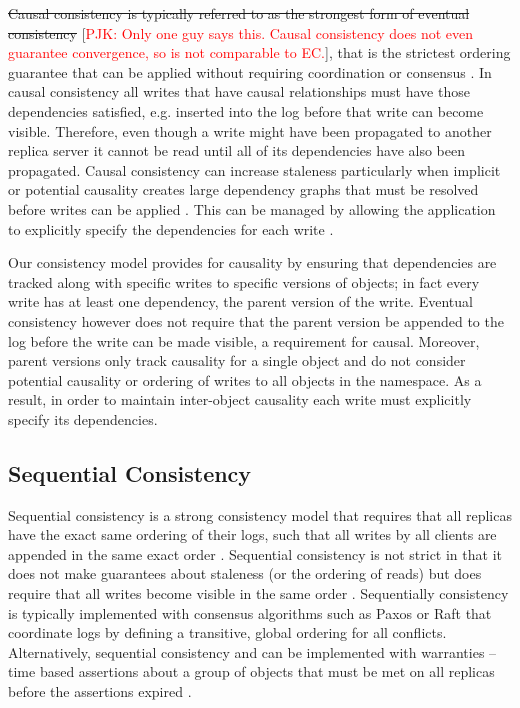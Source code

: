 \documentclass[10pt,conference,compsocconf,letterpaper]{IEEEtran}
\newcommand{\todo}[1]{{\textcolor{red}{#1}}}
\newcommand{\pjk}[1]{[\todo{PJK: #1}]}
\begin{document}
\st{Causal consistency is typically referred to as the strongest form of eventual consistency} \pjk{Only one guy says this. Causal consistency does not even guarantee convergence, so is not comparable to EC.}, that is the strictest ordering guarantee that can be applied without requiring coordination or consensus \cite{ladin_providing_1992}. In causal consistency all writes that have causal relationships must have those dependencies satisfied, e.g. inserted into the log before that write can become visible. Therefore, even though a write might have been propagated to another replica server it cannot be read until all of its dependencies have also been propagated. Causal consistency can increase staleness particularly when implicit or potential causality creates large dependency graphs that must be resolved before writes can be applied \cite{lloyd_dont_2011}. This can be managed by allowing the application to explicitly specify the dependencies for each write \cite{bailis_potential_2012}.

Our consistency model provides for causality by ensuring that dependencies are tracked along with specific writes to specific versions of objects; in fact every write has at least one dependency, the parent version of the write. Eventual consistency however does not require that the parent version be appended to the log before the write can be made visible, a requirement for causal. Moreover, parent versions only track causality for a single object and do not consider potential causality or ordering of writes to all objects in the namespace. As a result, in order to maintain inter-object causality each write must explicitly specify its dependencies.

\subsection{Sequential Consistency}

Sequential consistency is a strong consistency model that requires that all replicas have the exact same ordering of their logs, such that all writes by all clients are appended in the same exact order \cite{attiya_sequential_1994}. Sequential consistency is not strict in that it does not make guarantees about staleness (or the ordering of reads) but does require that all writes become visible in the same order \cite{bermbach_consistency_2013}. Sequentially consistency is typically implemented with consensus algorithms such as Paxos \cite{lamport_fast_2006} or Raft \cite{ongaro_search_2014} that coordinate logs by defining a transitive, global ordering for all conflicts. Alternatively, sequential consistency and can be implemented with warranties -- time based assertions about a group of objects that must be met on all replicas before the assertions expired \cite{liu_warranties_2014}.
\end{document}

